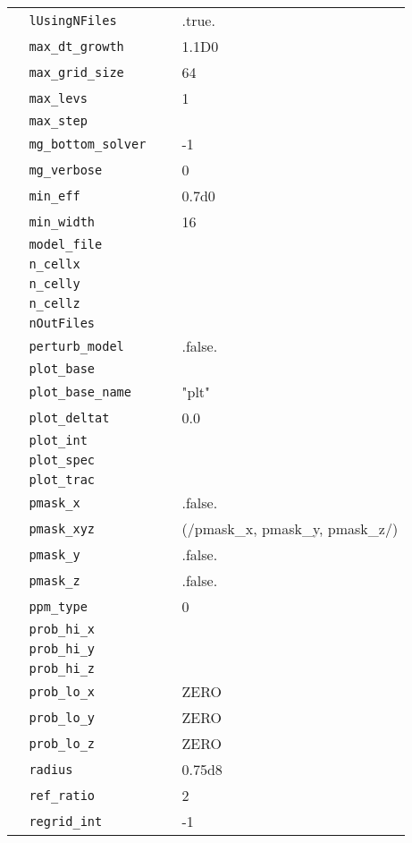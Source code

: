 \begin{center}
\begin{longtable}{|l|p{3.0in}|l|}
\verb=  lUsingNFiles =  &   &  .true. \\
\verb=  max_dt_growth =  &   &  1.1D0 \\
\verb=  max_grid_size =  &   &  64 \\
\verb=  max_levs =  &   &  1 \\
\verb=  max_step =  &   &  \\
\verb=  mg_bottom_solver =  &   &  -1 \\
\verb=  mg_verbose =  &   &  0 \\
\verb=  min_eff =  &   &  0.7d0 \\
\verb=  min_width =  &   &  16 \\
\verb=  model_file =  &   &  \\
\verb=  n_cellx =  &   &  \\
\verb=  n_celly =  &   &  \\
\verb=  n_cellz =  &   &  \\
\verb=  nOutFiles =  &   &  \\
\verb=  perturb_model =  &   &  .false. \\
\verb=  plot_base =  &   &  \\
\verb=  plot_base_name =  &   &  "plt" \\
\verb=  plot_deltat =  &   &  0.0 \\
\verb=  plot_int =  &   &  \\
\verb=  plot_spec =  &   &  \\
\verb=  plot_trac =  &   &  \\
\verb=  pmask_x =  &   &  .false. \\
\verb=  pmask_xyz =  &   &  (/pmask\_x, pmask\_y, pmask\_z/) \\
\verb=  pmask_y =  &   &  .false. \\
\verb=  pmask_z =  &   &  .false. \\
\verb=  ppm_type =  &   &  0 \\
\verb=  prob_hi_x =  &   &  \\
\verb=  prob_hi_y =  &   &  \\
\verb=  prob_hi_z =  &   &  \\
\verb=  prob_lo_x =  &   &  ZERO \\
\verb=  prob_lo_y =  &   &  ZERO \\
\verb=  prob_lo_z =  &   &  ZERO \\
\verb=  radius =  &   &  0.75d8 \\
\verb=  ref_ratio =  &   &  2 \\
\verb=  regrid_int =  &   &  -1 \\

\end{longtable}
\end{center}
